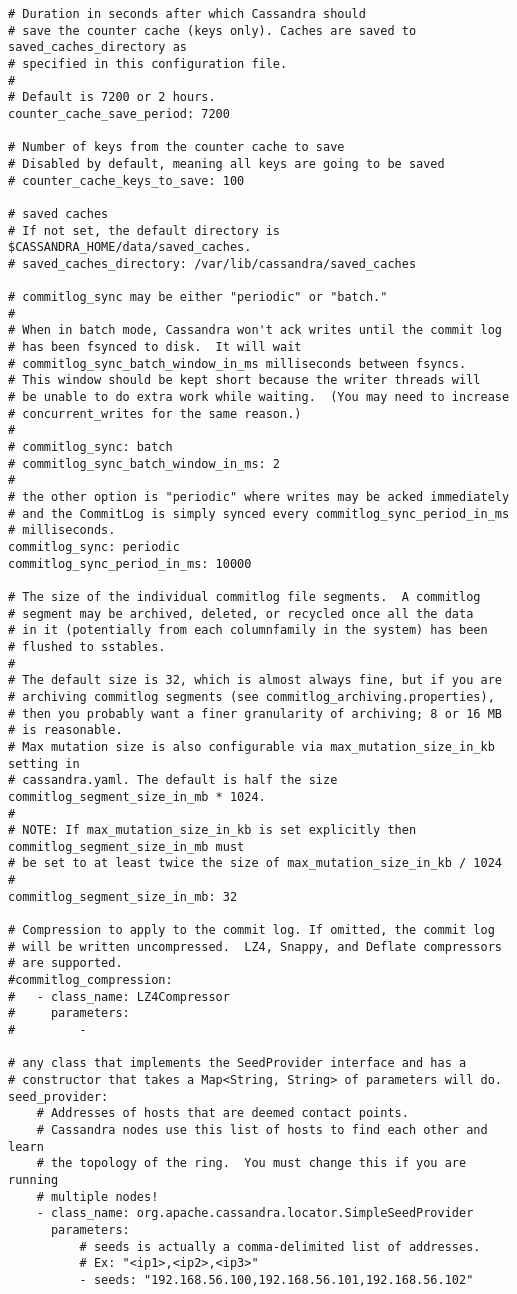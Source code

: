 \begin{verbatim}
# Duration in seconds after which Cassandra should
# save the counter cache (keys only). Caches are saved to saved_caches_directory as
# specified in this configuration file.
#
# Default is 7200 or 2 hours.
counter_cache_save_period: 7200

# Number of keys from the counter cache to save
# Disabled by default, meaning all keys are going to be saved
# counter_cache_keys_to_save: 100

# saved caches
# If not set, the default directory is $CASSANDRA_HOME/data/saved_caches.
# saved_caches_directory: /var/lib/cassandra/saved_caches

# commitlog_sync may be either "periodic" or "batch." 
# 
# When in batch mode, Cassandra won't ack writes until the commit log
# has been fsynced to disk.  It will wait
# commitlog_sync_batch_window_in_ms milliseconds between fsyncs.
# This window should be kept short because the writer threads will
# be unable to do extra work while waiting.  (You may need to increase
# concurrent_writes for the same reason.)
#
# commitlog_sync: batch
# commitlog_sync_batch_window_in_ms: 2
#
# the other option is "periodic" where writes may be acked immediately
# and the CommitLog is simply synced every commitlog_sync_period_in_ms
# milliseconds. 
commitlog_sync: periodic
commitlog_sync_period_in_ms: 10000

# The size of the individual commitlog file segments.  A commitlog
# segment may be archived, deleted, or recycled once all the data
# in it (potentially from each columnfamily in the system) has been
# flushed to sstables.
#
# The default size is 32, which is almost always fine, but if you are
# archiving commitlog segments (see commitlog_archiving.properties),
# then you probably want a finer granularity of archiving; 8 or 16 MB
# is reasonable.
# Max mutation size is also configurable via max_mutation_size_in_kb setting in
# cassandra.yaml. The default is half the size commitlog_segment_size_in_mb * 1024.
#
# NOTE: If max_mutation_size_in_kb is set explicitly then commitlog_segment_size_in_mb must
# be set to at least twice the size of max_mutation_size_in_kb / 1024
#
commitlog_segment_size_in_mb: 32

# Compression to apply to the commit log. If omitted, the commit log
# will be written uncompressed.  LZ4, Snappy, and Deflate compressors
# are supported.
#commitlog_compression:
#   - class_name: LZ4Compressor
#     parameters:
#         -

# any class that implements the SeedProvider interface and has a
# constructor that takes a Map<String, String> of parameters will do.
seed_provider:
    # Addresses of hosts that are deemed contact points. 
    # Cassandra nodes use this list of hosts to find each other and learn
    # the topology of the ring.  You must change this if you are running
    # multiple nodes!
    - class_name: org.apache.cassandra.locator.SimpleSeedProvider
      parameters:
          # seeds is actually a comma-delimited list of addresses.
          # Ex: "<ip1>,<ip2>,<ip3>"
          - seeds: "192.168.56.100,192.168.56.101,192.168.56.102"


\end{verbatim}
